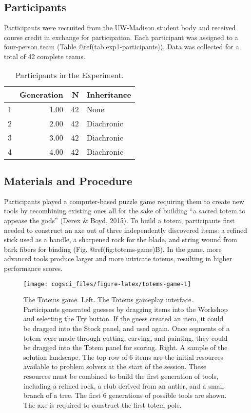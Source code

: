 \documentclass[10pt, letterpaper]{article}
\newenvironment{CodeChunk}{}{}
\begin{document}
\hypertarget{participants}{%
\subsection{Participants}\label{participants}}

Participants were recruited from the UW-Madison student body and
received course credit in exchange for participation. Each participant
was assigned to a four-person team (Table @ref(tab:exp1-participants)).
Data was collected for a total of 42 complete teams.

\begin{table}[H]
\centering
\begin{tabular}{rrrl}
  \hline
 & Generation & N & Inheritance \\ 
  \hline
1 & 1.00 &  42 & None \\ 
  2 & 2.00 &  42 & Diachronic \\ 
  3 & 3.00 &  42 & Diachronic \\ 
  4 & 4.00 &  42 & Diachronic \\ 
   \hline
\end{tabular}
\caption{Participants in the Experiment.} 
\end{table}

\hypertarget{materials-and-procedure}{%
\subsection{Materials and Procedure}\label{materials-and-procedure}}

Participants played a computer-based puzzle game requiring them to
create new tools by recombining existing ones all for the sake of
building ``a sacred totem to appease the gods'' (Derex \& Boyd, 2015).
To build a totem, participants first needed to construct an axe out of
three independently discovered items: a refined stick used as a handle,
a sharpened rock for the blade, and string wound from bark fibers for
binding (Fig. @ref(fig:totems-game)B). In the game, more advanced tools
produce larger and more intricate totems, resulting in higher
performance scores.

\begin{CodeChunk}
\begin{figure*}[tb]
\texttt{[image: cogsci\_files/figure-latex/totems-game-1]} \caption[The Totems game]{The Totems game. Left. The Totems gameplay interface. Participants generated guesses by dragging items into the Workshop and selecting the Try button. If the guess created an item, it could be dragged into the Stock panel, and used again. Once segments of a totem were made through cutting, carving, and painting, they could be dragged into the Totem panel for scoring. Right. A sample of the solution landscape. The top row of 6 items are the initial resources available to problem solvers at the start of the session. These resources must be combined to build the first generation of tools, including a refined rock, a club derived from an antler, and a small branch of a tree. The first 6 generations of possible tools are shown. The axe is required to construct the first totem pole.}\label{fig:totems-game}
\end{figure*}
\end{CodeChunk}
\end{document}
